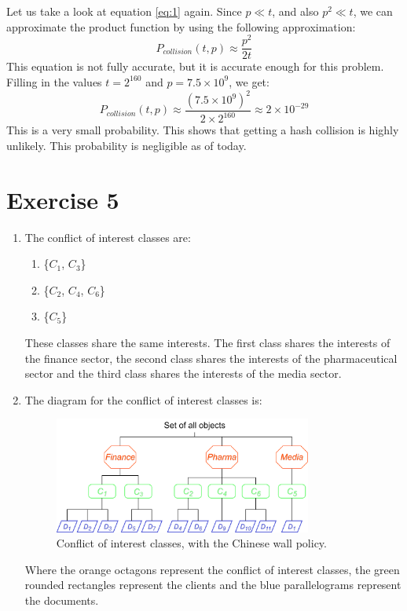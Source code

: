 \documentclass[twoside, a4paper, fleqn, reqno]{article}
\begin{document}
Let us take a look at equation \ref{eq:1} again. Since $p \ll t$, and also $p^{2} \ll t$, we can approximate the product function
by using the following approximation:
\begin{equation}
	\label{eq:3}
	P_{collision}(t, p) \approx \frac{p^{2}}{2t}
\end{equation}
This equation is not fully accurate, but it is accurate enough for this problem.
Filling in the values $t=2^{160}$ and $p=7.5\times10^{9}$, we get:
\begin{equation}
	\label{eq:4}
	P_{collision}(t, p) \approx \frac{(7.5\times10^{9})^{2}}{2\times2^{160}} \approx 2\times10^{-29}
\end{equation}
This is a very small probability. This shows that getting a hash collision is highly unlikely.
This probability is negligible as of today.\\


\section*{Exercise 5}

\begin{enumerate}
	\item The conflict of interest classes are:
	\begin{enumerate}
		\item \{$C_1$, $C_3$\}
		\item \{$C_2$, $C_4$, $C_6$\}
		\item \{$C_5$\}
	\end{enumerate}
	These classes share the same interests. The first class shares the interests of the finance sector,
	the second class shares the interests of the pharmaceutical sector and the third class shares the
	interests of the media sector.\\
	\item The diagram for the conflict of interest classes is:
	\begin{figure}[H]
		\centering
		\includegraphics[width=0.8\textwidth]{./media/chinese_wall_policy.drawio.png}
		\caption{Conflict of interest classes, with the Chinese wall policy.}
	\end{figure}
	Where the orange octagons represent the conflict of interest classes,
	the green rounded rectangles represent the clients and the blue parallelograms represent the documents.

\end{enumerate}
\end{document}
